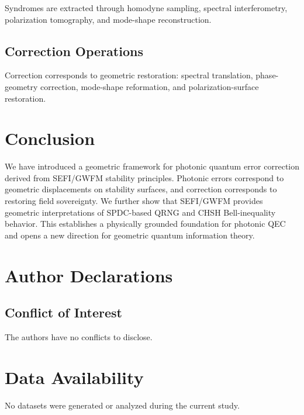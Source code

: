 \documentclass[aip, reprint, superscriptaddress]{revtex4-2}
\begin{document}
Syndromes are extracted through homodyne sampling, spectral interferometry, 
polarization tomography, and mode-shape reconstruction.

\subsection{Correction Operations}

Correction corresponds to geometric restoration: spectral translation, phase-geometry 
correction, mode-shape reformation, and polarization-surface restoration.

\section{Conclusion}

We have introduced a geometric framework for photonic quantum error correction derived 
from SEFI/GWFM stability principles. Photonic errors correspond to geometric 
displacements on stability surfaces, and correction corresponds to restoring field 
sovereignty. We further show that SEFI/GWFM provides geometric interpretations of 
SPDC-based QRNG and CHSH Bell-inequality behavior. This establishes a physically 
grounded foundation for photonic QEC and opens a new direction for geometric quantum 
information theory.

\section*{Author Declarations}

\subsection*{Conflict of Interest}
The authors have no conflicts to disclose.

\section*{Data Availability}
No datasets were generated or analyzed during the current study.


\end{document}
